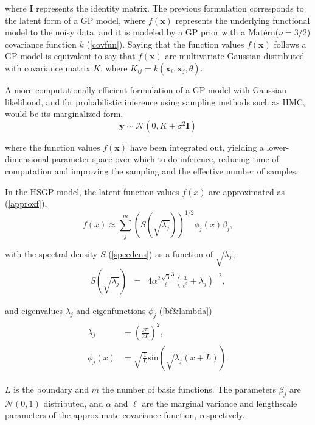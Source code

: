 \documentclass[]{interact}
\theoremstyle{plain}%
\theoremstyle{definition}
\theoremstyle{remark}
\begin{document}
\noindent where $\mathbf{I}$ represents the identity matrix. The previous formulation corresponds to the latent form of a GP model, where $f(\mathbf{x})$ represents the underlying functional model to the noisy data, and it is modeled by a GP prior with a Mat{\'e}rn($\nu=3/2$) covariance function $k$ (\ref{covfun}). Saying that the function values $f(\mathbf{x})$ follows a GP model is equivalent to say that $f(\mathbf{x})$ are multivariate Gaussian distributed with covariance matrix $K$, where $K_{ij}=k(\mathbf{x}_i,\mathbf{x}_j,\theta)$.
 
A more computationally efficient formulation of a GP model with Gaussian likelihood, and for probabilistic inference using sampling methods such as HMC, would be its marginalized form,
%
\begin{equation*}\label{eq:marginalizedgp_simudata1}
\mathbf{y} \sim \mathcal{N}(0, K + \sigma^2 \mathbf{I} )
\end{equation*}

\noindent where the function values $f(\mathbf{x})$ have been integrated out, yielding a lower-dimensional parameter space over which to do inference, reducing time of computation and improving the sampling and the effective number of samples.

In the HSGP model, the latent function values $f(x)$ are approximated as (\ref{approxf}),
%
\begin{equation*}
f(x) \approx \sum_{j}^m \left( S(\sqrt{\lambda_j})\right)^{1/2} \phi_j(x) \beta_j,
\end{equation*}

\noindent with the spectral density $S$ (\ref{specdens}) as a function of $\sqrt{\lambda_j}$,
%
\begin{eqnarray*}
S(\sqrt{\lambda_j})&=& 4\alpha^2 \frac{\sqrt{3}}{\ell}^{3}(\frac{3}{\ell^2} + \lambda_j)^{-2}, 
\end{eqnarray*}

\noindent and eigenvalues $\lambda_j$ and eigenfunctions $\phi_j$ (\ref{bf&lambda})
%
\begin{eqnarray*}
\begin{split}
\lambda_j&=\left(\frac{j\pi}{2L}\right)^2, \\
\phi_j(x)&=\sqrt{\frac{1}{L}} \text{sin}\left(\sqrt{\lambda_j}(x+L)\right).
\end{split}
\end{eqnarray*} 

\noindent $L$ is the boundary and $m$ the number of basis functions. The parameters $\beta_j$ are $\mathcal{N}(0,1)$ distributed, and $\alpha$ and $\ell$ are the marginal variance and lengthscale parameters of the approximate covariance function, respectively.
\end{document}
